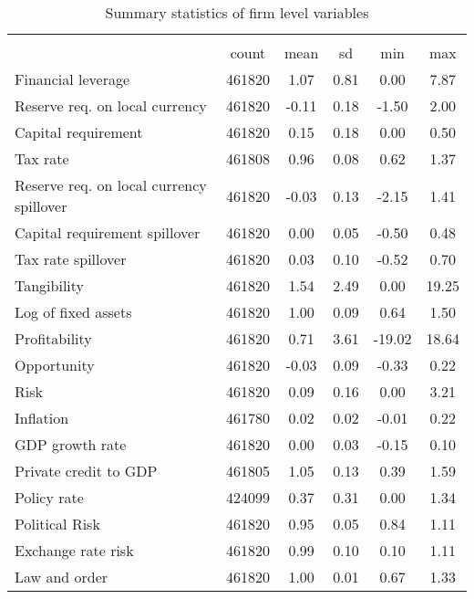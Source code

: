 \begin{table}[htbp]\centering
\def\sym#1{\ifmmode^{#1}\else\(^{#1}\)\fi}
\caption{Summary statistics of firm level variables}
\begin{tabular}{l*{1}{ccccc}}
\hline\hline
                    &\multicolumn{5}{c}{}                                            \\
                    &       count&        mean&          sd&         min&         max\\
\hline
Financial leverage  &      461820&        1.07&        0.81&        0.00&        7.87\\
Reserve req. on local currency&      461820&       -0.11&        0.18&       -1.50&        2.00\\
Capital requirement &      461820&        0.15&        0.18&        0.00&        0.50\\
Tax rate            &      461808&        0.96&        0.08&        0.62&        1.37\\
Reserve req. on local currency spillover&      461820&       -0.03&        0.13&       -2.15&        1.41\\
Capital requirement spillover&      461820&        0.00&        0.05&       -0.50&        0.48\\
Tax rate spillover  &      461820&        0.03&        0.10&       -0.52&        0.70\\
Tangibility         &      461820&        1.54&        2.49&        0.00&       19.25\\
Log of fixed assets &      461820&        1.00&        0.09&        0.64&        1.50\\
Profitability       &      461820&        0.71&        3.61&      -19.02&       18.64\\
Opportunity         &      461820&       -0.03&        0.09&       -0.33&        0.22\\
Risk                &      461820&        0.09&        0.16&        0.00&        3.21\\
Inflation           &      461780&        0.02&        0.02&       -0.01&        0.22\\
GDP growth rate     &      461820&        0.00&        0.03&       -0.15&        0.10\\
Private credit to GDP&      461805&        1.05&        0.13&        0.39&        1.59\\
Policy rate         &      424099&        0.37&        0.31&        0.00&        1.34\\
Political Risk      &      461820&        0.95&        0.05&        0.84&        1.11\\
Exchange rate risk  &      461820&        0.99&        0.10&        0.10&        1.11\\
Law and order       &      461820&        1.00&        0.01&        0.67&        1.33\\
\hline\hline
\end{tabular}
\end{table}
